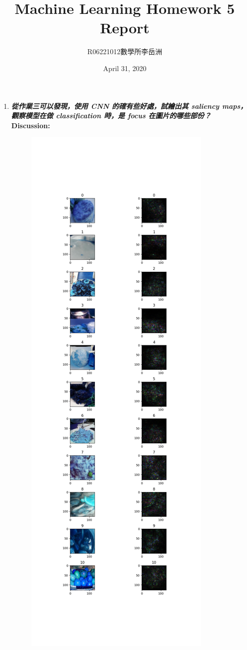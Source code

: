 \documentclass[a4paper,11pt]{article}
\title{Machine Learning Homework 5 Report}
\author{R06221012\hspace{0.2cm}數學所\hspace{0.2cm}李岳洲}
\date{April 31, 2020}
\begin{document}
\maketitle

\begin{enumerate}
	\item \textit{\textbf{從作業三可以發現，使用 CNN 的確有些好處，試繪出其 saliency maps，觀察模型在做 classification 時，是 focus 在圖片的哪些部份？}}\\

	\textbf{Discussion:}\\

		\begin{figure}[htp]
		    \begin{center}
		    		\includegraphics[scale=0.4]{./saliency_results.png}

\end{center}
\end{figure}
\end{enumerate}
\end{document}
